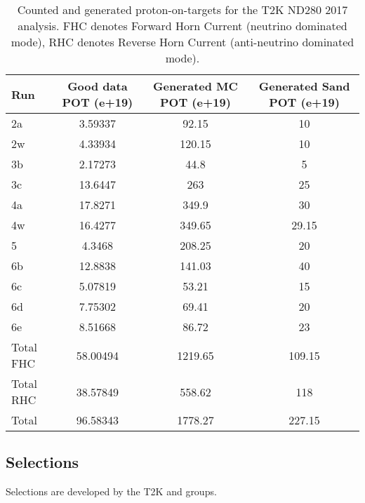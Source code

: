 \begin{table}[htbp]
	\centering
	\begin{tabular}{ l c c c }
		\hline
                Run & Good data POT (e+19) & Generated MC POT (e+19) & Generated Sand POT (e+19) \\
		\hline
		\hline
		2a  & 3.59337    & 92.15       & 10 \\
		2w  & 4.33934    & 120.15      & 10 \\
		\hline
		3b  & 2.17273    & 44.8        & 5 \\
		3c  & 13.6447    & 263         & 25 \\
		\hline
		4a  & 17.8271    & 349.9       & 30 \\
		4w  & 16.4277    & 349.65      & 29.15 \\
		\hline
		5   & 4.3468     & 208.25      & 20 \\
		\hline
		6b  & 12.8838    & 141.03      & 40 \\
		6c  & 5.07819    & 53.21       & 15 \\
		6d  & 7.75302    & 69.41       & 20 \\
		6e  & 8.51668    & 86.72       & 23 \\
		\hline
		Total FHC & 58.00494 & 1219.65 & 109.15\\
		Total RHC & 38.57849 & 558.62  & 118 \\
		Total & 96.58343 & 1778.27 & 227.15 \\
		\hline
	\end{tabular}
	\caption{Counted and generated proton-on-targets for the T2K ND280 2017 analysis. FHC denotes Forward Horn Current (neutrino dominated mode), RHC denotes Reverse Horn Current (anti-neutrino dominated mode).}
	\label{tab:pot_2017}
\end{table}




\subsection{Selections}
\label{subsec:ND280:sel}
Selections are developed by the T2K \numu and \nue groups. 


